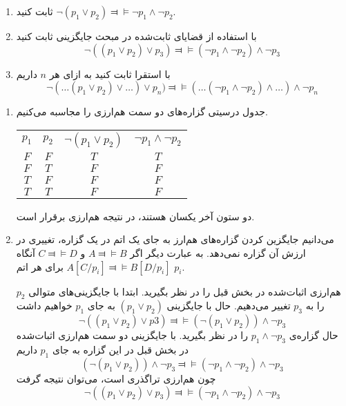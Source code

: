 \begin{enumerate}[label=(\alph*)]
  \item
  ثابت کنید
  $\neg(p_1\vee p_2)\Dashv\vDash\neg p_1\wedge\neg p_2$.
  
  \item
  با استفاده از قضایای ثابت‌شده در مبحث جایگزینی ثابت کنید
  $$\neg((p_1\vee p_2)\vee p_3)\Dashv\vDash (\neg p_1 \wedge \neg p_2)\wedge\neg p_3$$
  
  \item
  با استقرا ثابت کنید به ازای هر $n$ داریم
  $$\neg(\ldots(p_1\vee p_2)\vee \ldots)\vee p_n)\Dashv\vDash (\ldots(\neg p_1\wedge \neg p_2)\wedge\ldots)\wedge\neg p_n$$
  \end{enumerate}\quad\vspace{-9mm}
  \begin{ans}
    \begin{enumerate}
      \item جدول درسیتی گزاره‌های دو سمت هم‌ارزی را مجاسبه می‌کنیم.
      \begin{LTR}
        \begin{tabular}{| c | c | c | c |}
          $p_1$ & $p_2$ & $\neg (p_1 \vee p_2)$ & $\neg p_1 \wedge \neg p_2$ \\
          $F$ & $F$ & $T$ & $T$ \\
          $F$ & $T$ & $F$ & $F$ \\
          $T$ & $F$ & $F$ & $F$ \\
          $T$ & $T$ & $F$ & $F$
        \end{tabular}
      \end{LTR}
      دو ستون آخر یکسان هستند، در نتیجه هم‌ارزی برقرار است.
  
      \item
      می‌دانیم جایگزین کردن گزاره‌های هم‌ارز به جای یک اتم در یک گزاره، تغییری در ارزش آن گزاره نمی‌دهد. به عبارت دیگر اگر
      $A \Dashv\vDash B$ و
      $C \Dashv\vDash D$
      آنگاه
      $A[C/p_i] \Dashv\vDash B[D/p_i]$
      برای هر اتم $p_i$.
  
      هم‌ارزی اثبات‌شده در بخش قبل را در نظر بگیرید. ابتدا با جایگزینی‌های متوالی $p_2$ را به $p_3$ تغییر می‌دهیم.
      حال با جایگزینی
      $(p_1 \vee p_2)$
      به جای
      $p_1$
      خواهیم داشت
      $$ \neg ((p_1 \vee p_2) \vee p3) \Dashv\vDash (\neg (p_1 \vee p_2)) \wedge \neg p_3 $$
      حال گزاره‌ی
      $p_1 \wedge \neg p_3$
      را در نظر بگیرید. با جایگزینی دو سمت هم‌ارزی اثبات‌شده در بخش قبل در این گزاره به جای
      $p_1$
      داریم
      $$ (\neg (p_1 \vee p_2)) \wedge \neg p_3 \Dashv\vDash (\neg p_1 \wedge \neg p_2) \wedge \neg p_3 $$
      چون هم‌ارزی تراگذری است، می‌توان نتیجه گرفت
      $$ \neg((p_1\vee p_2)\vee p_3)\Dashv\vDash (\neg p_1 \wedge \neg p_2)\wedge\neg p_3 $$
  

\end{enumerate}
\end{ans}
